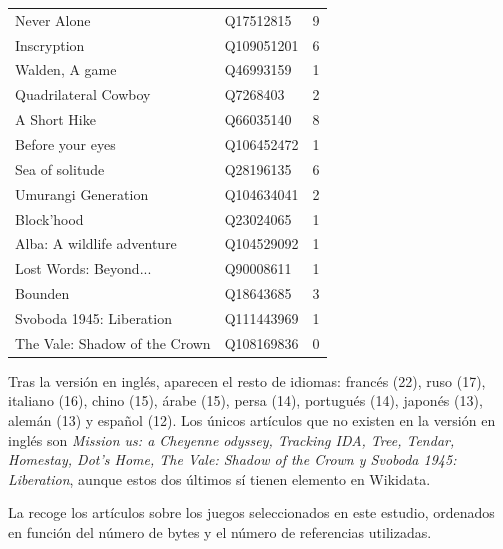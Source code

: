 \documentclass[spanish]{textolivre}
\begin{document}
\begin{table}[h!]
\begin{threeparttable}
\begin{tabular}{lll}
Never 			Alone                   & Q17512815  & 9       \\ 
Inscryption                      & Q109051201 & 6       \\ 
Walden, 			A game                & Q46993159  & 1       \\ 
Quadrilateral 			Cowboy          & Q7268403   & 2       \\ 
A 			Short Hike                  & Q66035140  & 8       \\ 
Before 			your eyes              & Q106452472 & 1       \\ 
Sea 			of solitude               & Q28196135  & 6       \\ 
Umurangi 			Generation           & Q104634041 & 2       \\ 
Block’hood                       & Q23024065  & 1       \\ 
Alba: 			A wildlife adventure    & Q104529092 & 1       \\ 
Lost 			Words: Beyond...         & Q90008611  & 1       \\ 
Bounden                          & Q18643685  & 3       \\ 
Svoboda 			1945: Liberation      & Q111443969 & 1       \\ 
The 			Vale: Shadow of the Crown & Q108169836 & 0       \\ 
\bottomrule
\end{tabular}
\end{threeparttable}
\end{table}

Tras la versión en inglés, aparecen el resto de idiomas: francés (22), ruso (17), italiano (16), chino (15), árabe (15), persa (14), portugués (14), japonés (13), alemán (13) y español (12). Los únicos artículos que no existen en la versión en inglés son \emph{Mission us: a Cheyenne odyssey, Tracking IDA, Tree, Tendar, Homestay, Dot’s Home, The Vale: Shadow of the Crown y Svoboda 1945: Liberation}, aunque estos dos últimos sí tienen elemento en Wikidata.

La  recoge los artículos sobre los juegos seleccionados en este estudio, ordenados en función del número de bytes y el número de referencias utilizadas.
\end{document}
